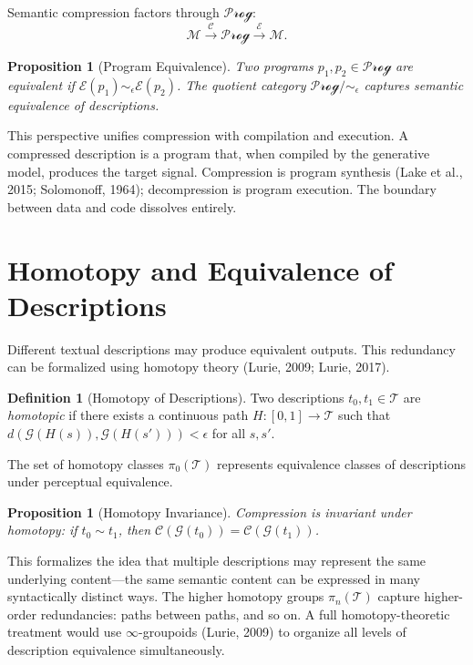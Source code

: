 \documentclass[11pt,a4paper]{article}
\newtheorem{proposition}[theorem]{Proposition}
\theoremstyle{definition}
\newtheorem{definition}[theorem]{Definition}
\theoremstyle{remark}
\begin{document}
Semantic compression factors through $\mathcal{Prog}$:
\[
\mathcal{M} \xrightarrow{\mathcal{C}} \mathcal{Prog} \xrightarrow{\mathcal{E}} \mathcal{M}.
\]

\begin{proposition}[Program Equivalence]
Two programs $p_1, p_2 \in \mathcal{Prog}$ are equivalent if $\mathcal{E}(p_1) \sim_\epsilon \mathcal{E}(p_2)$. The quotient category $\mathcal{Prog}/\!\sim_\epsilon$ captures semantic equivalence of descriptions.
\end{proposition}

This perspective unifies compression with compilation and execution. A compressed description is a program that, when compiled by the generative model, produces the target signal. Compression is program synthesis (Lake et al., 2015; Solomonoff, 1964); decompression is program execution. The boundary between data and code dissolves entirely.

\section{Homotopy and Equivalence of Descriptions}
\label{sec:homotopy}

Different textual descriptions may produce equivalent outputs. This redundancy can be formalized using homotopy theory (Lurie, 2009; Lurie, 2017).

\begin{definition}[Homotopy of Descriptions]
Two descriptions $t_0, t_1 \in \mathcal{T}$ are \emph{homotopic} if there exists a continuous path $H : [0,1] \to \mathcal{T}$ such that $d(\mathcal{G}(H(s)), \mathcal{G}(H(s'))) < \epsilon$ for all $s,s'$.
\end{definition}

The set of homotopy classes $\pi_0(\mathcal{T})$ represents equivalence classes of descriptions under perceptual equivalence.

\begin{proposition}[Homotopy Invariance]
Compression is invariant under homotopy: if $t_0 \sim t_1$, then $\mathcal{C}(\mathcal{G}(t_0)) = \mathcal{C}(\mathcal{G}(t_1))$.
\end{proposition}

This formalizes the idea that multiple descriptions may represent the same underlying content---the same semantic content can be expressed in many syntactically distinct ways. The higher homotopy groups $\pi_n(\mathcal{T})$ capture higher-order redundancies: paths between paths, and so on. A full homotopy-theoretic treatment would use $\infty$-groupoids (Lurie, 2009) to organize all levels of description equivalence simultaneously.
\end{document}
